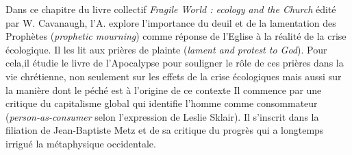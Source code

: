 Dans ce chapitre du livre collectif \textit{Fragile World : ecology and the Church} édité par W. Cavanaugh, l'A. explore l'importance du deuil et de la lamentation des Prophètes (\textit{prophetic mourning}) comme réponse de l'Eglise à la réalité de la crise écologique.  Il les lit aux prières de plainte (\textit{lament and protest to God}).  Pour cela,il étudie le livre de l'Apocalypse pour souligner le rôle de ces prières dans la vie chrétienne, non seulement sur les effets de la crise écologiques mais aussi sur la manière dont le péché est à l'origine de ce contexte \cite[p. 152]{cavanaugh_between_2018}
Il commence par une critique du capitalisme global qui identifie l'homme comme consommateur (\textit{person-as-consumer} selon l'expression de Leslie Sklair). Il s'inscrit dans la filiation de Jean-Baptiste Metz et de sa critique du progrès qui a longtemps irrigué la métaphysique occidentale.

